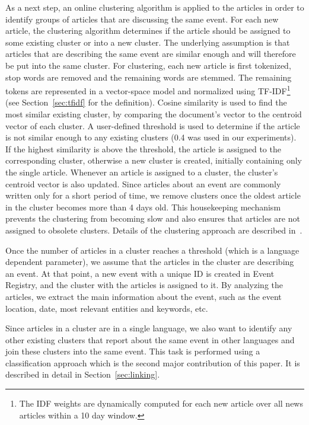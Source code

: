 \documentclass[twoside,11pt]{article}
\begin{document}
As a next step, an online clustering algorithm is applied to the articles in order to identify groups of articles that are discussing the same event. For each new article, the clustering algorithm determines if the article should be assigned to some existing cluster or into a new cluster. The underlying assumption is that articles that are describing the same event are similar enough and will therefore be put into the same cluster. For clustering, each new article is first tokenized, stop words are removed and the remaining words are stemmed.
The remaining tokens are represented in a vector-space model and normalized using TF-IDF\footnote{The IDF weights are dynamically computed for each new article over all news articles within a 10 day window.} (see Section~\ref{sec:tfidf} for the definition). Cosine similarity is used to find the most similar existing cluster, by comparing the document's vector to the centroid vector of each cluster. A user-defined threshold is used to determine if the article is not similar enough to any existing clusters (0.4 was used in our experiments).  If the highest similarity is above the threshold, the article is assigned to the corresponding cluster, otherwise a new cluster is created, initially containing only the single article. Whenever an article is assigned to a cluster, the cluster's centroid vector is also updated. Since articles about an event are commonly written only for a short period of time, we remove clusters once the oldest article in the cluster becomes more than 4 days old. This housekeeping mechanism prevents the clustering from becoming slow and also ensures that articles are not assigned to obsolete clusters. Details of the clustering approach are described in~\cite{brank2014}.

Once the number of articles in a cluster reaches a threshold (which is a language dependent parameter), we assume that the articles in the cluster are describing an event. At that point, a new event with a unique ID is created in Event Registry, and the cluster with the articles is assigned to it. By analyzing the articles, we extract the main information about the event, such as the event location, date, most relevant entities and keywords, etc.

Since articles in a cluster are in a single language, we also want to identify any other existing clusters that report about the same event in other languages and join these clusters into the same event. This task is performed using a classification approach which is the second major contribution of this paper. It is described in detail in Section~\ref{sec:linking}.
\end{document}

